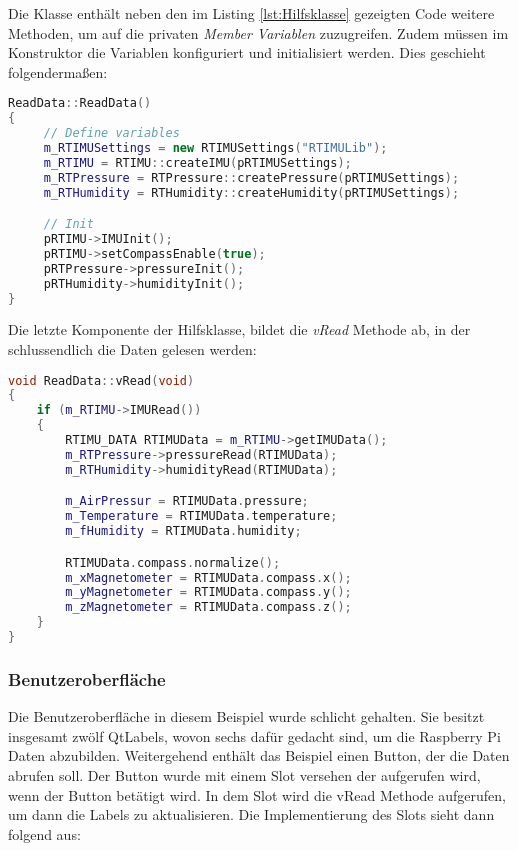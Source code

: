 Die Klasse enthält neben den im Listing \ref{lst:Hilfsklasse} gezeigten Code weitere
Methoden, um auf die privaten \emph{Member Variablen} zuzugreifen. Zudem müssen im Konstruktor
die Variablen konfiguriert und initialisiert werden. Dies geschieht folgendermaßen:

\begin{lstlisting}[language=C++, caption=RTIMU-Hilfsklasse-Konstruktor,
    label=lst:HilfsklasseKonstruktor]
ReadData::ReadData()
{
     // Define variables
     m_RTIMUSettings = new RTIMUSettings("RTIMULib");
     m_RTIMU = RTIMU::createIMU(pRTIMUSettings);
     m_RTPressure = RTPressure::createPressure(pRTIMUSettings);
     m_RTHumidity = RTHumidity::createHumidity(pRTIMUSettings);

     // Init
     pRTIMU->IMUInit();
     pRTIMU->setCompassEnable(true);
     pRTPressure->pressureInit();
     pRTHumidity->humidityInit();
}

\end{lstlisting}

Die letzte Komponente der Hilfsklasse, bildet die \emph{vRead} Methode ab, in der
schlussendlich die Daten gelesen werden:

\begin{lstlisting}[language=C++, caption=RTIMU-Hilfsklasse mit der Methode vRead,
    label=lst:vRead]
void ReadData::vRead(void)
{
    if (m_RTIMU->IMURead())
    {
        RTIMU_DATA RTIMUData = m_RTIMU->getIMUData();
        m_RTPressure->pressureRead(RTIMUData);
        m_RTHumidity->humidityRead(RTIMUData);

        m_AirPressur = RTIMUData.pressure;
        m_Temperature = RTIMUData.temperature;
        m_fHumidity = RTIMUData.humidity;

        RTIMUData.compass.normalize();
        m_xMagnetometer = RTIMUData.compass.x();
        m_yMagnetometer = RTIMUData.compass.y();
        m_zMagnetometer = RTIMUData.compass.z();
    }
}

\end{lstlisting}

\subsubsection{Benutzeroberfläche}
\label{subsubsec:QtGui}
Die Benutzeroberfläche in diesem Beispiel wurde schlicht gehalten. Sie besitzt insgesamt zwölf
QtLabels, wovon sechs dafür gedacht sind, um die Raspberry Pi Daten abzubilden. Weitergehend
enthält das Beispiel einen Button, der die Daten abrufen soll.
\newline
\newline
Der Button wurde mit einem Slot versehen der aufgerufen wird, wenn der Button betätigt wird. In
dem Slot wird die vRead Methode aufgerufen, um dann die Labels zu aktualisieren. Die
Implementierung des Slots sieht dann folgend aus:

